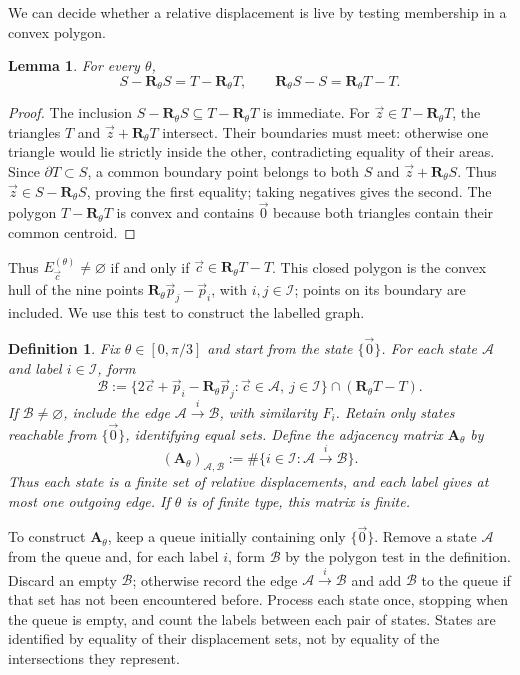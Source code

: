 \documentclass[scheme=plain]{ctexart}
\newtheorem{lemma}[theorem]{Lemma}
\newtheorem{definition}[theorem]{Definition}
\begin{document}
We can decide whether a relative displacement is live by testing membership in a convex polygon.

\begin{lemma}
\label{lem:filling}
For every $\theta$,
\[
S-\mathbf R_\theta S=T-\mathbf R_\theta T,
\qquad
\mathbf R_\theta S-S=\mathbf R_\theta T-T.
\]
\end{lemma}

\begin{proof}
The inclusion $S-\mathbf R_\theta S\subseteq T-\mathbf R_\theta T$ is immediate.
For $\vec z\in T-\mathbf R_\theta T$, the triangles $T$ and $\vec z+\mathbf R_\theta T$ intersect.
Their boundaries must meet: otherwise one triangle would lie strictly inside the other, contradicting equality of their areas.
Since $\partial T\subset S$, a common boundary point belongs to both $S$ and $\vec z+\mathbf R_\theta S$.
Thus $\vec z\in S-\mathbf R_\theta S$, proving the first equality; taking negatives gives the second.
The polygon $T-\mathbf R_\theta T$ is convex and contains $\vec{0}$ because both triangles contain their common centroid.
\end{proof}

Thus $E_{\vec c}^{(\theta)}\neq\varnothing$ if and only if $\vec c\in\mathbf R_\theta T-T$.
This closed polygon is the convex hull of the nine points $\mathbf R_\theta\vec p_j-\vec p_i$, with $i,j\in\mathcal I$; points on its boundary are included.
We use this test to construct the labelled graph.

\begin{definition}
\label{def:relative-displacement-matrix}
Fix $\theta\in[0,\pi/3]$ and start from the state $\{\vec{0}\}$.
For each state $\mathcal A$ and label $i\in\mathcal I$, form
\[
\mathcal B:=\bigl\{2\vec c+\vec p_i-\mathbf R_\theta\vec p_j:
\vec c\in\mathcal A,\ j\in\mathcal I\bigr\}
\cap(\mathbf R_\theta T-T).
\]
If $\mathcal B\neq\varnothing$, include the edge
$\mathcal A\xrightarrow{i}\mathcal B$, with similarity $F_i$.
Retain only states reachable from $\{\vec{0}\}$, identifying equal sets.
Define the adjacency matrix $\mathbf A_\theta$ by
\[
(\mathbf A_\theta)_{\mathcal A,\mathcal B}
:=\#\{i\in\mathcal I:\mathcal A\xrightarrow{i}\mathcal B\}.
\]
Thus each state is a finite set of relative displacements, and each label gives
at most one outgoing edge. If $\theta$ is of finite type, this matrix is finite.
\end{definition}

To construct $\mathbf A_\theta$, keep a queue initially containing only $\{\vec{0}\}$.
Remove a state $\mathcal A$ from the queue and, for each label $i$, form $\mathcal B$ by the polygon test in the definition.
Discard an empty $\mathcal B$; otherwise record the edge $\mathcal A\xrightarrow{i}\mathcal B$ and add $\mathcal B$ to the queue if that set has not been encountered before.
Process each state once, stopping when the queue is empty, and count the labels between each pair of states.
States are identified by equality of their displacement sets, not by equality of the intersections they represent.
\end{document}
